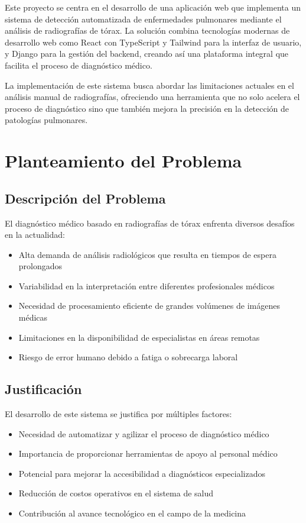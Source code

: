 \documentclass[conference]{IEEEtran}
\begin{document}
Este proyecto se centra en el desarrollo de una aplicación web que implementa un sistema de detección automatizada de enfermedades pulmonares mediante el análisis de radiografías de tórax. La solución combina tecnologías modernas de desarrollo web como React con TypeScript y Tailwind para la interfaz de usuario, y Django para la gestión del backend, creando así una plataforma integral que facilita el proceso de diagnóstico médico.

La implementación de este sistema busca abordar las limitaciones actuales en el análisis manual de radiografías, ofreciendo una herramienta que no solo acelera el proceso de diagnóstico sino que también mejora la precisión en la detección de patologías pulmonares.

\section{Planteamiento del Problema}
\subsection{Descripción del Problema}
El diagnóstico médico basado en radiografías de tórax enfrenta diversos desafíos en la actualidad:

\begin{itemize}
    \item Alta demanda de análisis radiológicos que resulta en tiempos de espera prolongados
    \item Variabilidad en la interpretación entre diferentes profesionales médicos
    \item Necesidad de procesamiento eficiente de grandes volúmenes de imágenes médicas
    \item Limitaciones en la disponibilidad de especialistas en áreas remotas
    \item Riesgo de error humano debido a fatiga o sobrecarga laboral
\end{itemize}

\subsection{Justificación}
El desarrollo de este sistema se justifica por múltiples factores:

\begin{itemize}
    \item Necesidad de automatizar y agilizar el proceso de diagnóstico médico
    \item Importancia de proporcionar herramientas de apoyo al personal médico
    \item Potencial para mejorar la accesibilidad a diagnósticos especializados
    \item Reducción de costos operativos en el sistema de salud
    \item Contribución al avance tecnológico en el campo de la medicina
\end{itemize}
\end{document}
